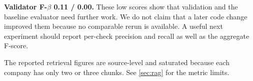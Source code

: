 \textbf{Validator F-$\beta$ 0.11 / 0.00.}
These low scores show that validation and the baseline evaluator need further
work. We do not claim that a later code change improved them because no
comparable rerun is available. A useful next experiment should report
per-check precision and recall as well as the aggregate F-score.

The reported retrieval figures are source-level and saturated because each
company has only two or three chunks. See \cref{sec:rag} for the metric limits.
